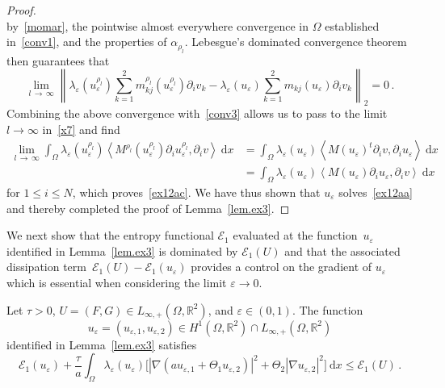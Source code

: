 \documentclass[AHL,Unicode,longabstracts,published]{cedram}
\newcommand{\bbR}{\mathbb{R}}
\newcommand{\clE}{\mathcal{E}}
\newcommand{\rmd}{\mathrm{d}}
\newcommand{\clE}{\mathcal{E}}
\begin{document}
\begin{proof}
\begin{equation*}
\end{equation*}
by~\eqref{momar}, the pointwise almost everywhere convergence in $\Omega$ established in~\eqref{conv1}, and the properties of $\alpha_{\rho_l}$. Lebesgue's dominated convergence theorem then guarantees that
\begin{equation*}
\lim_{l\,\to\,\infty} \left\| \lambda_\varepsilon(u_\varepsilon^{\rho_l}) \sum_{k=1}^2 m_{kj}^{\rho_l}(u_{\varepsilon}^{\rho_l}) \partial_i v_k - \lambda_\varepsilon(u_\varepsilon) \sum_{k=1}^2 m_{kj}(u_{\varepsilon}) \partial_i v_k \right\|_2 = 0\,.
\end{equation*}
Combining the above convergence with~\eqref{conv3} allows us to pass to the limit $l\to\infty$ in~\eqref{x7} and find
\begin{align*}
\lim_{l\,\to\,\infty} \int_\Omega \lambda_\varepsilon(u_\varepsilon^{\rho_l}) \left\langle M^{\rho_l}(u_{\varepsilon}^{\rho_l}) \partial_i u_{\varepsilon}^{\rho_l}, \partial_i v \right\rangle \ \rmd x & = \int_\Omega \lambda_\varepsilon(u_\varepsilon) \left\langle M(u_{\varepsilon})^t \partial_i v, \partial_i u_{\varepsilon} \right\rangle \ \rmd x \\
& = \int_\Omega \lambda_\varepsilon(u_\varepsilon) \left\langle M(u_{\varepsilon}) \partial_i u_{\varepsilon}, \partial_i v \right\rangle \ \rmd x
\end{align*}
for $1\le i \le N$, which proves~\eqref{ex12ac}. We have thus shown that $u_\varepsilon$ solves~\eqref{ex12aa} and thereby completed the proof of Lemma~\ref{lem.ex3}.
\end{proof}

We next show that the entropy functional $\clE_1$ evaluated at the function~$u_\varepsilon$ identified in Lemma~\ref{lem.ex3} is dominated by $\clE_1(U)$ and that the associated dissipation term~${\clE_1(U)-\clE_1(u_\varepsilon)}$ provides a control on the gradient of $u_\varepsilon$ which is essential when considering the limit $\varepsilon\to 0$.


\begin{lemm}\label{lem.ex4}
Let $\tau>0$, $U=(F,G)\in L_{\infty,+}(\Omega,\bbR^2)$, and $\varepsilon\in (0,1)$. The function
\begin{equation*}
u_{\varepsilon}=(u_{\varepsilon,1},u_{\varepsilon,2})\in H^1\left(\Omega,\bbR^2\right)\cap L_{\infty,+}\left(\Omega,\bbR^2\right)
\end{equation*}
identified in Lemma~\ref{lem.ex3} satisfies
\begin{equation*}
\clE_1(u_{\varepsilon}) + \frac{ \tau}{a} \int_\Omega \lambda_\varepsilon(u_{\varepsilon}) \big[\left|\nabla (a u_{\varepsilon,1} + \Theta_1 u_{\varepsilon,2})\right|^2 + \Theta_2 \left|\nabla u_{\varepsilon,2}\right|^2 \big]\ \rmd x \le \clE_1(U)\,.
\end{equation*}
\end{lemm}
\end{document}
